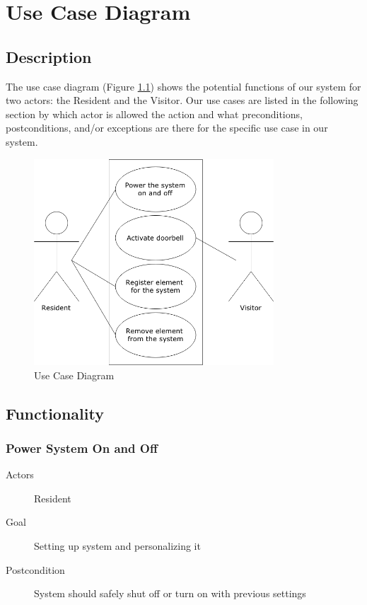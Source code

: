 \chapter{Use Case Diagram}

\section{Description}
The use case diagram (Figure \ref{fig:usecase}) shows the potential functions of our system for two actors: the Resident and the Visitor. Our use cases are listed in the following section by which actor is allowed the action and what preconditions, postconditions, and/or exceptions are there for the specific use case in our system.

\begin{figure}[h]
  \includegraphics[width=0.8\textwidth]{UseCase.png}
  \centering
  \caption{Use Case Diagram}
  \label{fig:usecase}
\end{figure}

\section{Functionality}

\subsection{Power System On and Off}
\begin{description}
\item [Actors] Resident
\item [Goal] Setting up system and personalizing it
\item [Postcondition] System should safely shut off or turn on with previous settings
\end{description}
